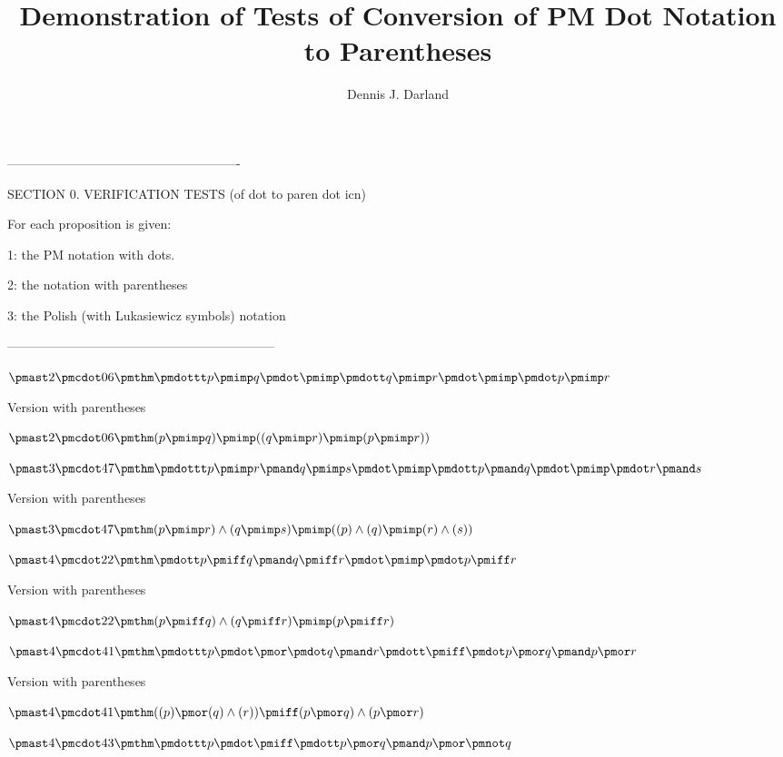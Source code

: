 \documentclass[12pt]{article}
\begin{document}
\title{Demonstration of Tests of Conversion of PM Dot Notation to Parentheses}
\author{Dennis J. Darland}
\maketitle

-------------------------------------------------------

SECTION 0. VERIFICATION TESTS (of dot to paren dot icn)

For each proposition is given:

1: the PM notation with dots.

2: the notation with parentheses 

3: the Polish (with Lukasiewicz symbols) notation

---------------------------------------------------------------

$\pmast 2 \pmcdot 06 \pmthm \pmdottt p \pmimp q \pmdot \pmimp \pmdott q \pmimp r \pmdot \pmimp \pmdot p \pmimp r $
 
 

Version with parentheses

$\pmast 2 \pmcdot 06 \pmthm  (  p \pmimp q  ) \pmimp ((  q \pmimp r  ) \pmimp (  p \pmimp r ))$


$\pmast 3 \pmcdot 47 \pmthm \pmdottt p \pmimp r \pmand q \pmimp s \pmdot \pmimp \pmdott p \pmand q \pmdot \pmimp \pmdot r \pmand s $
 
 

Version with parentheses

$\pmast 3 \pmcdot 47 \pmthm  (  p \pmimp r ) \land ( q \pmimp s  ) \pmimp ((  p ) \land ( q  ) \pmimp (  r ) \land ( s ))$


$\pmast 4 \pmcdot 22 \pmthm \pmdott p \pmiff q \pmand q \pmiff r \pmdot \pmimp \pmdot p \pmiff r$
 
 

Version with parentheses

$\pmast 4 \pmcdot 22 \pmthm  (  p \pmiff q ) \land ( q \pmiff r  ) \pmimp (  p \pmiff r)$


$\pmast 4 \pmcdot 41 \pmthm \pmdottt p \pmdot \pmor \pmdot q \pmand r \pmdott \pmiff \pmdot p \pmor q \pmand p \pmor r$
 
 

Version with parentheses

$\pmast 4 \pmcdot 41 \pmthm  ((  p  ) \pmor (  q ) \land ( r  )) \pmiff (  p \pmor q ) \land ( p \pmor r)$


$\pmast 4 \pmcdot 43 \pmthm \pmdottt p \pmdot \pmiff \pmdott p \pmor q \pmand p \pmor \pmnot q$
 
\end{document}
